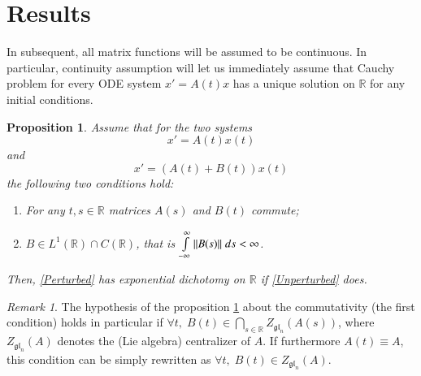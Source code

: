 \documentclass{elsarticle}
\newtheorem{proposition}{Proposition}
\theoremstyle{remark}
\newtheorem{remark}{Remark}
\begin{document}
\section{Results}
In subsequent, all matrix functions will be assumed to be continuous. 
In particular, continuity assumption will let us immediately assume
that Cauchy problem for every ODE system $x'=A(t)x$ has a unique solution on $\mathbb{R}$ for any initial conditions.
\begin{proposition}
	\label{strong}
	Assume that for the two systems 
	\begin{equation}\label{Unperturbed}
	x'=A(t)x(t)
	\end{equation}
	and
	\begin{equation}\label{Perturbed}
	x'=(A(t)+B(t))x(t)
	\end{equation}
	the following two conditions hold:
	\begin{enumerate}[(H1)]
	\item For any $t,s\in\mathbb{R}$ matrices $A(s)$ and $B(t)$ commute;
	\item $B\in L^1(\mathbb{R})\cap C(\mathbb{R})$, that is $\int_{-\infty}^{\infty}\mynorm{B(s)}\;ds<\infty$.
	\end{enumerate}
	Then, \eqref{Perturbed} has exponential dichotomy on $\mathbb{R}$ if \eqref{Unperturbed} does.
\end{proposition}
\begin{remark}The hypothesis of the proposition \ref{strong} about the commutativity (the first condition) holds in particular if
	$\forall t,\;B(t)\in\bigcap\limits_{s\in\mathbb{R}} Z_{\mathfrak{gl}_n}(A(s))$, where
	$Z_{\mathfrak{gl}_n}(A)$ denotes the (Lie algebra) centralizer of $A$.
	If furthermore $A(t)\equiv A$, this condition can be simply rewritten as $\forall t,\;B(t)\in Z_{\mathfrak{gl}_n}(A)$.\end{remark}
\end{document}
